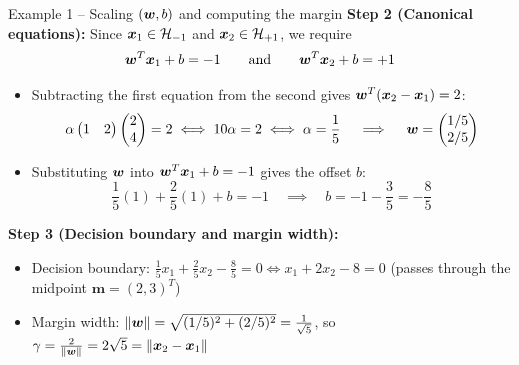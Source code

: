 \documentclass[aspectratio=169]{beamer}\usepackage[]{graphicx}\usepackage[]{xcolor}
\begin{document}
\begin{frame}{Example 1 -- Scaling $(\bm{w}, b)$ and computing the margin}
    \textbf{Step 2 (Canonical equations):} Since $\bm{x}_1 \in \mathcal{H}_{-1}$ and $\bm{x}_2 \in \mathcal{H}_{+1}$, we require
    \[
        \bm{w}^T \bm{x}_1 + b = -1 \qquad \text{and} \qquad \bm{w}^T \bm{x}_2 + b = +1
    \]
    \begin{itemize}
        \item Subtracting the first equation from the second gives $\bm{w}^T(\bm{x}_2 - \bm{x}_1) = 2$:
        \[
            \alpha \begin{pmatrix} 1 & 2 \end{pmatrix} \begin{pmatrix} 2 \\ 4 \end{pmatrix} = 2 \iff 10\alpha = 2 \iff \alpha = \frac{1}{5} \quad \implies \quad \bm{w} = \begin{pmatrix} 1/5 \\ 2/5 \end{pmatrix}
        \]
        \item Substituting $\bm{w}$ into $\bm{w}^T \bm{x}_1 + b = -1$ gives the offset $b$:
        \[
            \frac{1}{5}(1) + \frac{2}{5}(1) + b = -1 \quad \implies \quad b = -1 - \frac{3}{5} = -\frac{8}{5}
        \]
    \end{itemize}
    \vfill
    \textbf{Step 3 (Decision boundary and margin width):}
    \begin{itemize}
        \item Decision boundary: $\frac{1}{5}x_1 + \frac{2}{5}x_2 - \frac{8}{5} = 0 \iff x_1 + 2x_2 - 8 = 0$ (passes through the midpoint $\bm{m} = (2, 3)^T$)
        \item Margin width: $\|\bm{w}\| = \sqrt{(1/5)^2 + (2/5)^2} = \frac{1}{\sqrt{5}}$, so $\gamma = \frac{2}{\|\bm{w}\|} = 2\sqrt{5} = \|\bm{x}_2 - \bm{x}_1\|$
    \end{itemize}
\end{frame}
\end{document}
